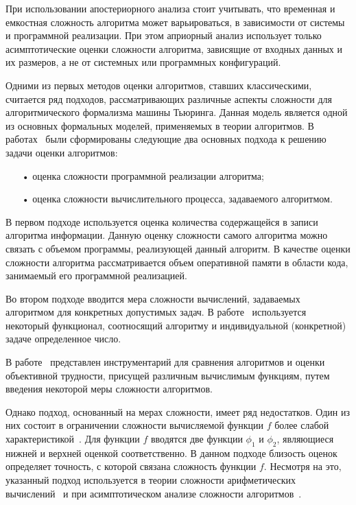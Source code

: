 \documentclass[a4paper, article, 14pt]{extarticle}
\begin{document}
При использовании апостериорного анализа стоит учитывать, что временная и емкостная сложность алгоритма может варьироваться, в зависимости от системы и программной реализации. При этом априорный анализ использует только асимптотические оценки сложности алгоритма, зависящие от входных данных и их размеров, а не от системных или программных конфигураций.

Одними из первых методов оценки алгоритмов, ставших классическими, считается ряд подходов, рассматривающих различные аспекты сложности для алгоритмического формализма машины Тьюринга. Данная модель является одной из основных формальных моделей, применяемых в теории алгоритмов. В работах~\cite{trachtenbort_common, ofman} были сформированы следующие два основных подхода к решению задачи оценки алгоритмов:

\begin{enumerate}
	\item[•] оценка сложности программной реализации алгоритма;

	\item[•] оценка сложности вычислительного процесса, задаваемого алгоритмом.
\end{enumerate}

В первом подходе используется оценка количества содержащейся в записи алгоритма информации. Данную оценку сложности самого алгоритма можно связать с объемом программы, реализующей данный алгоритм. В качестве оценки сложности алгоритма рассматривается объем оперативной памяти в области кода, занимаемый его программной реализацией.

Во втором подходе вводится мера сложности вычислений, задаваемых алгоритмом для конкретных допустимых задач. В работе~\cite{caytin} используется некоторый функционал, соотносящий алгоритму и индивидуальной (конкретной) задаче определенное число.

В работе~\cite{trachtenbort_recursion} представлен инструментарий для сравнения алгоритмов и оценки объективной трудности, присущей различным вычислимым функциям, путем введения некоторой меры сложности алгоритмов.

Однако подход, основанный на мерах сложности, имеет ряд недостатков. Один из них состоит в ограничении сложности вычисляемой функции $f$ более слабой характеристикой~\cite{alpherova}. Для функции $f$ вводятся две функции $\phi_1$ и $\phi_2$, являющиеся нижней и верхней оценкой соответственно. В данном подходе близость оценок определяет точность, с которой связана сложность функции $f$. Несмотря на это, указанный подход используется в теории сложности арифметических вычислений~\cite{gashkov} и при асимптотическом анализе сложности алгоритмов~\cite{cormen}.
\end{document}
